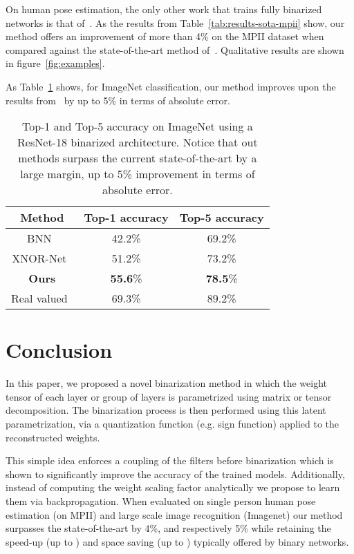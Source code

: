 \documentclass[10pt,twocolumn,letterpaper]{article}
\begin{document}
On human pose estimation, the only other work that trains fully binarized networks is that of~\cite{bulat2017binarized}. As the results from Table~\ref{tab:results-sota-mpii} show, our method offers an improvement of more than 4\% on the MPII dataset when compared against the state-of-the-art method of~\cite{bulat2017binarized}. Qualitative results are shown in figure~\ref{fig:examples}.


As Table~\ref{tab:results-sota-imagenet} shows, for ImageNet classification, our method improves upon the results from~\cite{rastegari2016xnor} by up to 5\% in terms of absolute error.

\begin{table}[!htbp]
\small{
	\begin{center}
		\begin{tabular}{|c|c|c|}
			\hline
			Method & Top-1 accuracy & Top-5 accuracy \\
			\hline\hline
			BNN~\cite{courbariaux2016binarized} & 42.2\% & 69.2\% \\
			XNOR-Net~\cite{rastegari2016xnor} & 51.2\% & 73.2\% \\
			\hline
			\textbf{Ours} & \textbf{55.6}\%  & \textbf{78.5}\% \\
			\hline
			Real valued~\cite{he2016deep} & 69.3\% & 89.2\% \\
            \hline
		\end{tabular}
	\end{center}
	}
	\caption{Top-1 and Top-5 accuracy on ImageNet using a ResNet-18 binarized architecture. Notice that out methods surpass the current state-of-the-art by a large margin, up to 5\% improvement in terms of absolute error.}
	\label{tab:results-sota-imagenet}
\end{table} 
\section{Conclusion}\label{sec:conclusion}

In this paper, we proposed a novel binarization method in which the weight tensor of each layer or group of layers is parametrized using matrix or tensor decomposition. The binarization process is then performed using this latent parametrization, via a quantization function (e.g. sign function) applied to the reconstructed weights. 

This simple idea enforces a coupling of the filters before binarization which is shown to significantly improve the accuracy of the trained models. Additionally, instead of computing the weight scaling factor analytically we propose to learn them via backpropagation. When evaluated on single person human pose estimation (on MPII) and large scale image recognition (Imagenet) our method surpasses the state-of-the-art by 4\%, and respectively 5\% while retaining the speed-up (up to ) and space saving (up to ) typically offered by binary networks.
 
\end{document}
